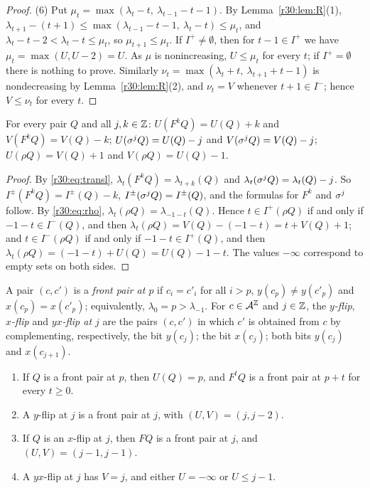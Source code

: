 \begin{proof}
(6) Put $\mu_t=\max(\lambda_t-t,\ \lambda_{t-1}-t-1)$. By Lemma~\ref{r30:lem:R}(1), $\lambda_{t+1}-(t+1)\le\max(\lambda_{t-1}-t-1,\ \lambda_t-t)\le\mu_t$, and $\lambda_t-t-2<\lambda_t-t\le\mu_t$, so $\mu_{t+1}\le\mu_t$. If $I^+\ne\emptyset$, then for $t-1\in I^+$ we have $\mu_t=\max(U,U-2)=U$. As $\mu$ is nonincreasing, $U\le\mu_t$ for every $t$; if $I^+=\emptyset$ there is nothing to prove. Similarly $\nu_t=\max(\lambda_t+t,\ \lambda_{t+1}+t-1)$ is nondecreasing by Lemma~\ref{r30:lem:R}(2), and $\nu_t=V$ whenever $t+1\in I^-$; hence $V\le\nu_t$ for every $t$.
\end{proof}

\begin{lemma}\label{r30:lem:transl}
For every pair $Q$ and all $j,k\in\mathbb{Z}$:
$U(F^kQ)=U(Q)+k$ and $V(F^kQ)=V(Q)-k$;
$U(\sigma^jQ)=U(Q)-j$ and $V(\sigma^jQ)=V(Q)-j$;
$U(\rho Q)=V(Q)+1$ and $V(\rho Q)=U(Q)-1$.
\end{lemma}

\begin{proof}
By \eqref{r30:eq:transl}, $\lambda_t(F^kQ)=\lambda_{t+k}(Q)$ and $\lambda_t(\sigma^jQ)=\lambda_t(Q)-j$. So $I^\pm(F^kQ)=I^\pm(Q)-k$, $I^\pm(\sigma^jQ)=I^\pm(Q)$, and the formulas for $F^k$ and $\sigma^j$ follow. By \eqref{r30:eq:rho}, $\lambda_t(\rho Q)=\lambda_{-1-t}(Q)$. Hence $t\in I^+(\rho Q)$ if and only if $-1-t\in I^-(Q)$, and then $\lambda_t(\rho Q)=V(Q)-(-1-t)=t+V(Q)+1$; and $t\in I^-(\rho Q)$ if and only if $-1-t\in I^+(Q)$, and then $\lambda_t(\rho Q)=(-1-t)+U(Q)=U(Q)-1-t$. The values $-\infty$ correspond to empty sets on both sides.
\end{proof}

\begin{definition}\label{r30:def:front}
A pair $(c,c')$ is a \emph{front pair at $p$} if $c_i=c'_i$ for all $i>p$, $y(c_p)\ne y(c'_p)$ and $x(c_p)=x(c'_p)$; equivalently, $\lambda_0=p>\lambda_{-1}$. For $c\in\mathcal{A}^{\mathbb{Z}}$ and $j\in\mathbb{Z}$, the \emph{$y$-flip}, \emph{$x$-flip} and \emph{$yx$-flip at $j$} are the pairs $(c,c')$ in which $c'$ is obtained from $c$ by complementing, respectively, the bit $y(c_j)$; the bit $x(c_j)$; both bits $y(c_j)$ and $x(c_{j+1})$.
\end{definition}

\begin{lemma}\label{r30:lem:flips}
\begin{enumerate}
\item If $Q$ is a front pair at $p$, then $U(Q)=p$, and $F^tQ$ is a front pair at $p+t$ for every $t\ge0$.
\item A $y$-flip at $j$ is a front pair at $j$, with $(U,V)=(j,j-2)$.
\item If $Q$ is an $x$-flip at $j$, then $FQ$ is a front pair at $j$, and $(U,V)=(j-1,j-1)$.
\item A $yx$-flip at $j$ has $V=j$, and either $U=-\infty$ or $U\le j-1$.
\end{enumerate}
\end{lemma}

